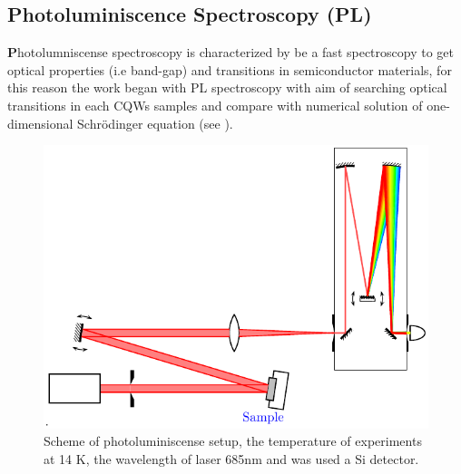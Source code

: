 \subsection{Photoluminiscence Spectroscopy (PL)}
\label{subsec:chapter-3-pl}
\vspace{-10mm}
\lettrine[lines=3, lraise=.1, nindent=0mm, slope=0mm]{\textbf{P}}{}hotolumniscense spectroscopy is characterized by be a fast spectroscopy to get optical properties (i.e band-gap) and transitions in  semiconductor materials, for this reason the work began with PL spectroscopy with aim of searching optical transitions in each CQWs samples and compare with  numerical solution of one-dimensional Schr\"odinger equation (see ). 
\begin{figure}
	\centering
	\includegraphics[width=\textwidth]{../figures/chapter-3/pl-setup/build/pl-setup}
	\caption[PL Scheme]{Scheme of photoluminiscense setup, the temperature of experiments  at 14 K, the wavelength of laser  685nm and was used a Si detector. }
	\label{fig:chapter-3 subsec 3.2.1 PL setup}
\end{figure}
 
